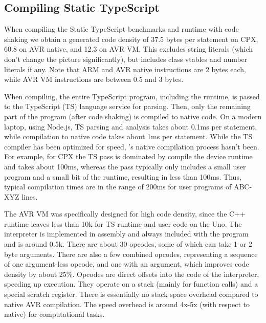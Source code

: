 \subsection{Compiling Static TypeScript}


When compiling the Static TypeScript benchmarks and runtime with code shaking we obtain
a generated code density of 37.5 bytes per statement on CPX, 60.8 on AVR native, and 12.3 on AVR VM.
This excludes string literals (which don't change the picture significantly), but includes class
vtables and number literals if any. Note that ARM and AVR native instructions are 2 bytes each,
while AVR VM instructions are between 0.5 and 3 bytes.

When compiling, the entire TypeScript program, including the runtime, is
passed to the TypeScript (TS) language service for parsing. Then, only the remaining
part of the program (after code shaking) is compiled to native code.
On a modern laptop, using Node.js, TS parsing and analysis takes about 0.1ms per statement,
while \MC compilation to native code takes about 1ms per statement.
While the TS compiler has been optimized for speed,
\MCN's native compilation process hasn't been.
For example, for CPX the TS pass is dominated by compile the device runtime
and takes about 100ms, whereas the \MC pass typically only includes a small user program
and a small bit of the runtime, resulting in less than 100ms.
Thus, typical compilation times are in the range of 200ms for user programs
of ABC-XYZ lines.

The AVR VM was specifically designed for high code density, since the C++ runtime
leaves less than 10k for TS runtime and user code on the Uno.
The interpreter is implemented in assembly and always included with the program and is around 0.5k.
There are about 30 opcodes, some of which can take 1 or 2 byte arguments.
There are also a few combined opcodes, representing a sequence of one argument-less opcode,
and one with an argument, which improves code density by about 25\%.
Opcodes are direct offsets into the code of the interpreter, speeding up execution.
They operate on a stack (mainly for function calls) and a special scratch register.
There is essentially no stack space overhead compared to native AVR compilation.
The speed overhead is around 4x-5x (with respect to native) for computational tasks.


